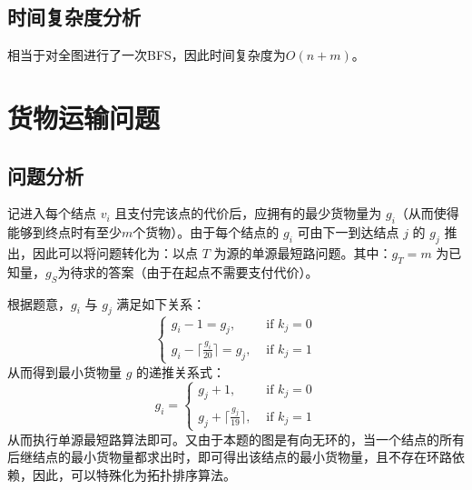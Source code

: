 \documentclass[11pt]{article}
\begin{document}
\subsection*{时间复杂度分析}
    相当于对全图进行了一次BFS，因此时间复杂度为$O(n+m)$。


\section{货物运输问题}
\subsection*{问题分析}
    记进入每个结点 $v_i$ 且支付完该点的代价后，应拥有的最少货物量为 $g_i$（从而使得能够到终点时有至少$m$个货物）。由于每个结点的 $g_i$ 可由下一到达结点 $j$ 的 $g_j$ 推出，因此可以将问题转化为：以点 $T$ 为源的单源最短路问题。其中：$g_T = m$ 为已知量，$g_S$为待求的答案（由于在起点不需要支付代价）。

    根据题意，$g_i$ 与 $g_j$ 满足如下关系：
    \begin{equation}
        \begin{cases}
            g_i - 1 = g_j, & \text{ if } k_j = 0\\
            g_i - \lceil\frac{g_i}{20}\rceil = g_j, & \text{ if } k_j = 1 
        \end{cases}
    \end{equation}
    从而得到最小货物量 $g$ 的递推关系式：
    \begin{equation}
        g_i = \begin{cases}
            g_j + 1, & \text{ if } k_j = 0\\
            g_j + \lceil\frac{g_j}{19}\rceil, & \text{ if } k_j = 1
        \end{cases}
    \end{equation}
    从而执行单源最短路算法即可。又由于本题的图是有向无环的，当一个结点的所有后继结点的最小货物量都求出时，即可得出该结点的最小货物量，且不存在环路依赖，因此，可以特殊化为拓扑排序算法。
\end{document}

